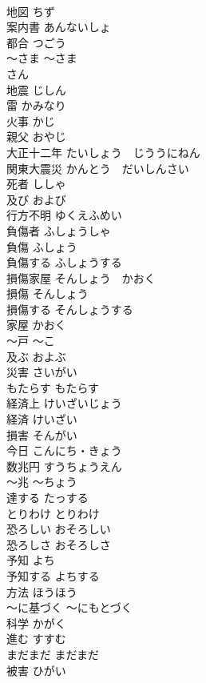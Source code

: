 \documentclass[8pt]{extreport}
\begin{document}
\begin{CJK}{UTF8}{min}
\\	地図	ちず	
\\	案内書	あんないしょ	
\\	都合	つごう	
\\	〜さま	〜さま	
\\	さん
\\	地震	じしん	
\\	雷	かみなり	
\\	火事	かじ	
\\	親父	おやじ	
\\	大正十二年	たいしょう　じううにねん	
\\	関東大震災	かんとう　だいしんさい	
\\	死者	ししゃ	
\\	及び	および	
\\	行方不明	ゆくえふめい	
\\	負傷者	ふしょうしゃ	
\\	負傷	ふしょう	
\\	負傷する	ふしょうする	
\\	損傷家屋	そんしょう　かおく	
\\	損傷	そんしょう	
\\	損傷する	そんしょうする	
\\	家屋	かおく	
\\	〜戸	〜こ	
\\	及ぶ	およぶ	
\\	災害	さいがい	
\\	もたらす	もたらす	
\\	経済上	けいざいじょう	
\\	経済	けいざい	
\\	損害	そんがい	
\\	今日	こんにち・きょう	
\\	数兆円	すうちょうえん	
\\	〜兆	〜ちょう	
\\	達する	たっする	
\\	とりわけ	とりわけ	
\\	恐ろしい	おそろしい	
\\	恐ろしさ	おそろしさ	
\\	予知	よち	
\\	予知する	よちする	
\\	方法	ほうほう	
\\	〜に基づく	〜にもとづく	
\\	科学	かがく	
\\	進む	すすむ	
\\	まだまだ	まだまだ	
\\	被害	ひがい	

\end{CJK}
\end{document}
